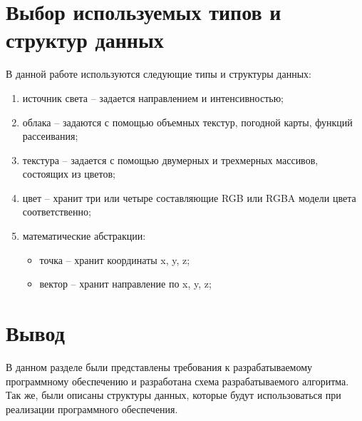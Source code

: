 \newpage

\section{Выбор используемых типов и структур данных}

В данной работе используются следующие типы и структуры данных:
\begin{enumerate}
	\item источник света -- задается направлением и интенсивностью;
	\item облака -- задаются с помощью объемных текстур, погодной карты, функций рассеивания;
	\item текстура -- задается с помощью двумерных и трехмерных массивов, состоящих из цветов;
	\item цвет -- хранит три или четыре составляющие RGB или RGBA модели цвета соответственно;
	\item математические абстракции: 
		\begin{itemize}
			\item точка -- хранит координаты x, y, z;
			\item вектор -- хранит направление по x, y, z;
		\end{itemize}
\end{enumerate}


\section*{Вывод}
В данном разделе были представлены требования к разрабатываемому
программному обеспечению и разработана схема разрабатываемого алгоритма.
Так же, были описаны структуры данных, которые будут использоваться при реализации программного обеспечения.

